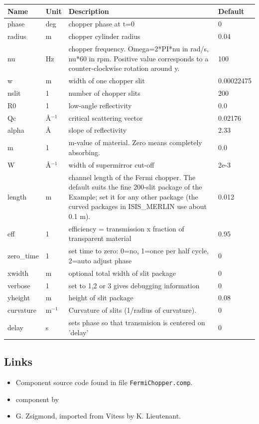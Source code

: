 \begin{longtable}{p{}p{}p{}p{}}
\toprule
\textbf{Name} & \textbf{Unit} & \textbf{Description} & \textbf{Default} \\
\midrule
\endhead
phase & deg & chopper phase at t=0 & 0 \\
radius & m & chopper cylinder radius & 0.04 \\
nu & Hz & chopper frequency. Omega=2*PI*nu in rad/s, nu*60 in rpm. Positive value corresponds to a counter-clockwise rotation around y. & 100 \\
w & m & width of one chopper slit & 0.00022475 \\
nslit & 1 & number of chopper slits & 200 \\
R0 & 1 & low-angle reflectivity & 0.0 \\
Qc & \AA{}$^{-1}$ & critical scattering vector & 0.02176 \\
alpha & \AA{} & slope of reflectivity & 2.33 \\
m & 1 & m-value of material. Zero means completely absorbing. & 0.0 \\
W & \AA{}$^{-1}$ & width of supermirror cut-off & 2e-3 \\
length & m & channel length of the Fermi chopper. The default suits the fine 200-slit package of the Example; set it for any other package (the curved packages in ISIS\_MERLIN use about 0.1 m). & 0.012 \\
eff & 1 & efficiency = transmission x fraction of transparent material & 0.95 \\
zero\_time & 1 & set time to zero: 0=no, 1=once per half cycle, 2=auto adjust phase & 0 \\
xwidth & m & optional total width of slit package & 0 \\
verbose & 1 & set to 1,2 or 3 gives debugging information & 0 \\
yheight & m & height of slit package & 0.08 \\
curvature & m$^{-1}$ & Curvature of slits (1/radius of curvature). & 0 \\
delay & s & sets phase so that transmision is centered on 'delay' & 0 \\
\bottomrule
\end{longtable}

\subsection*{Links}
\begin{itemize}
  \item Component source code found in file \texttt{FermiChopper.comp}.
  \item {} component by
  \item G. Zsigmond, imported from Vitess by K. Lieutenant.
\end{itemize}
